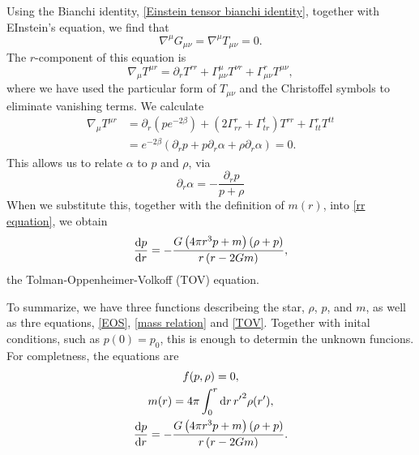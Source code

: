 Using the Bianchi identity, \autoref{Einstein tensor bianchi identity}, together with EInstein's equation, we find that
%
\begin{equation}
    \nabla^\mu G_{\mu \nu} = \nabla^\mu T_{\mu \nu} = 0.
\end{equation}
%
The $r$-component of this equation is
%
\begin{equation}
    \nabla_\mu T^{\mu r} 
    =
    \partial_r T^{rr} 
    + \Gamma^\mu_{\mu \nu} T^{\nu r} 
    + \Gamma^r_{\mu \nu} T^{\mu \nu},
\end{equation}
%
where we have used the particular form of $T_{\mu \nu}$ and the Christoffel symbols to eliminate vanishing terms.
We calculate
%
\begin{align*}
    \nabla_\mu T^{\mu r} 
    & = 
    \partial_r \left(p e^{-2\beta}\right)
    + (2 \Gamma^r_{rr} + \Gamma^t_{tr}) T^{rr} 
    + \Gamma^r_{tt}T^{tt} \\ 
    &=   e^{-2\beta} \left( \partial_r p + p \partial_r \alpha + \rho \partial_r \alpha \right) = 0.
\end{align*} 
%
This allows us to relate $\alpha$ to $p$ and $\rho$, via
\begin{equation}
    \partial_r \alpha = - \frac{\partial_r p}{p + \rho}
\end{equation}
When we substitute this, together with the definition of $m(r)$, into \autoref{rr equation}, we obtain
\begin{equation}
    \label{TOV}
    \diff{p}{r}
    =
    -
    \frac{
        G \left(4 \pi r^{3} p + m \right) \left(\rho + p \right)
        }
        {r \left(r- 2 G m\right)},
\end{equation}
the Tolman-Oppenheimer-Volkoff (TOV) equation.

To summarize, we have three functions describeing the star, $\rho$, $p$, and $m$, as well as thre equations, \autoref{EOS}, \autoref{mass relation} and \autoref{TOV}.
Together with inital conditions, such as $p(0) = p_0$, this is enough to determin the unknown funcions.
For completness, the equations are
\begin{gather*} 
    f(p, \rho) = 0, \\
    m(r) = 4 \pi \int_0^r \dd r \, {r'}^2 \rho(r'),\\
    \diff{p}{r} =
    -
    \frac{G \left(4 \pi r^{3} p + m \right) \left(\rho + p \right)}{r \left(r- 2 G m\right)}.
\end{gather*}
